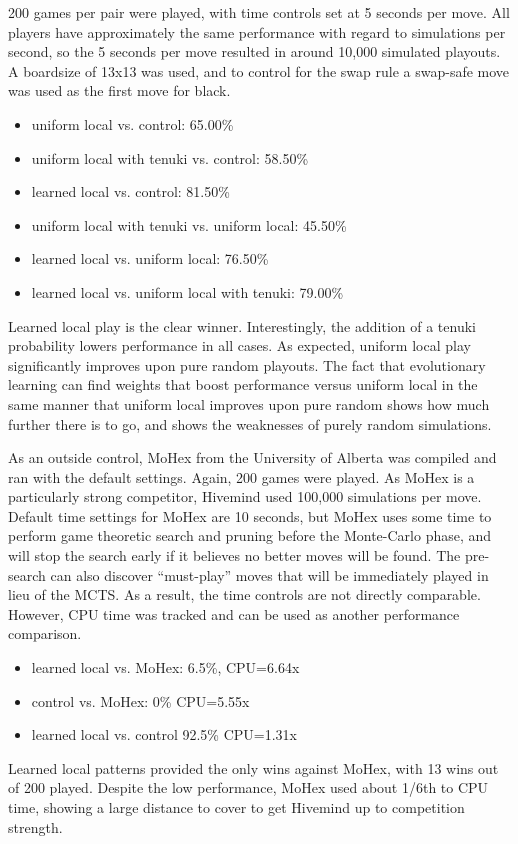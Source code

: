 \documentclass[10pt,a4paper]{report}
\begin{document}
200 games per pair were played, with time controls set at 5 seconds per move. All players have approximately the same performance with regard to simulations per second, so the 5 seconds per move resulted in around 10,000 simulated playouts. A boardsize of 13x13 was used, and to control for the swap rule a swap-safe move was used as the first move for black.

\begin{itemize}
\item uniform local vs. control: 65.00\%
\item uniform local with tenuki vs. control: 58.50\%
\item learned local vs. control: 81.50\%
\item uniform local with tenuki vs. uniform local: 45.50\%
\item learned local vs. uniform local: 76.50\%
\item learned local vs. uniform local with tenuki: 79.00\%
\end{itemize}

Learned local play is the clear winner. Interestingly, the addition of a tenuki probability lowers performance in all cases. As expected, uniform local play significantly improves upon pure random playouts. The fact that evolutionary learning can find weights that boost performance versus uniform local in the same manner that uniform local improves upon pure random shows how much further there is to go, and shows the weaknesses of purely random simulations.

As an outside control, MoHex from the University of Alberta was compiled and ran with the default settings\cite{mohex}. Again, 200 games were played. As MoHex is a particularly strong competitor, Hivemind used 100,000 simulations per move. Default time settings for MoHex are 10 seconds, but MoHex uses some time to perform game theoretic search and pruning before the Monte-Carlo phase, and will stop the search early if it believes no better moves will be found. The pre-search can also discover ``must-play'' moves that will be immediately played in lieu of the MCTS. As a result, the time controls are not directly comparable. However, CPU time was tracked and can be used as another performance comparison.

\begin{itemize}
\item learned local vs. MoHex: 6.5\%, CPU=6.64x
\item control vs. MoHex: 0\% CPU=5.55x
\item learned local vs. control 92.5\% CPU=1.31x
\end{itemize}

Learned local patterns provided the only wins against MoHex, with 13 wins out of 200 played. Despite the low performance, MoHex used about 1/6th to CPU time, showing a large distance to cover to get Hivemind up to competition strength.



\end{document}
